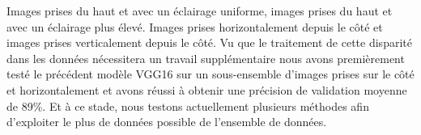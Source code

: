 \documentclass[11pt]{article}
\begin{document}
Images prises du haut et avec un éclairage uniforme, images prises du haut et
avec un éclairage plus élevé. Images prises horizontalement depuis le côté et
images prises verticalement depuis le côté. Vu que le traitement de cette
disparité dans les données nécessitera un travail supplémentaire nous avons
premièrement testé le précédent modèle VGG16 sur un sous-ensemble d'images
prises sur le côté et horizontalement et avons réussi à obtenir une précision de
validation moyenne de 89\%. Et à ce stade, nous testons actuellement plusieurs
méthodes afin d'exploiter le plus de données possible de l'ensemble de données.
\end{document}
